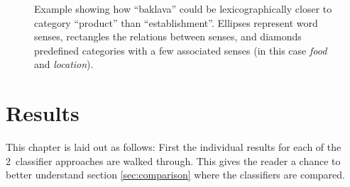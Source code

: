 \documentclass[a4paper,11pt]{kth-mag}
\newcommand{\numClassifierAproaches}{2}
\begin{document}
\begin{figure}[t]
  \centering
  \caption{Example showing how ``baklava'' could be lexicographically closer to category ``product'' than ``establishment''. Ellipses represent word senses, rectangles the relations between senses, and diamonds predefined categories with a few associated senses (in this case \emph{food} and \emph{location}).}
  \label{fig:baklava_lex}
\end{figure}

\clearpage



\section{Results}

This chapter is laid out as follows: First the individual results for each of the \numClassifierAproaches~classifier approaches are walked through. This gives the reader a chance to better understand section \ref{sec:comparison} where the classifiers are compared.
\end{document}
